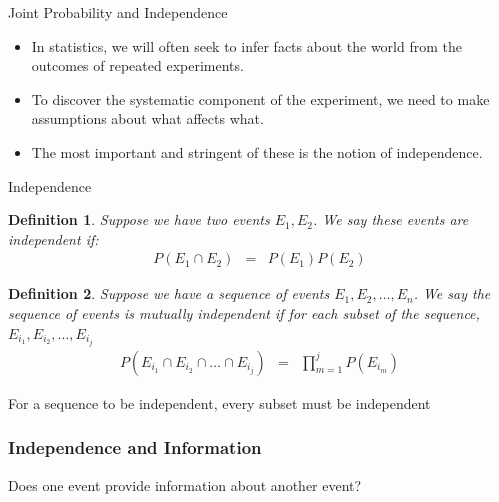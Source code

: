 \documentclass{beamer}
\newtheorem{defn}{Definition}
\numberwithin{equation}{section}
\begin{document}
\begin{frame}{Joint Probability and Independence}

\begin{itemize}
\item In statistics, we will often seek to infer facts about the world from the outcomes of repeated experiments.\pause
\item To discover the systematic component of the experiment, we need to make assumptions about what affects what.\pause
\item The most important and stringent of these is the notion of independence.
\end{itemize}
\end{frame}


\begin{frame}{Independence}

\begin{defn}
Suppose we have two events $E_{1}, E_{2}$.  We say these events are \alert{independent} if:
\begin{eqnarray}
P(E_{1}\cap E_{2}) & = & P(E_{1}) P( E_{2}) \nonumber 
\end{eqnarray}
\end{defn}

\end{frame}



\begin{frame}

\begin{defn}
Suppose we have a sequence of events $E_{1}, E_{2}, \hdots, E_{n}$.  We say the sequence of events is \alert{mutually independent} if for each subset of the sequence,  $E_{i_{1}}, E_{i_{2}}, \hdots, E_{i_{j}}$ 
\begin{eqnarray}
P(E_{i_{1}}\cap E_{i_{2}}\cap \hdots \cap E_{i_{j}}) & = & \prod_{m = 1}^{j} P(E_{i_{m}}) \nonumber 
\end{eqnarray}
\end{defn}

\alert{For a sequence to be independent, every subset must be independent }


\end{frame}


\begin{frame}
\frametitle{Independence and Information} 

Does one event provide \alert{information} about another event? \pause 

\pause


\end{frame}
\end{document}
